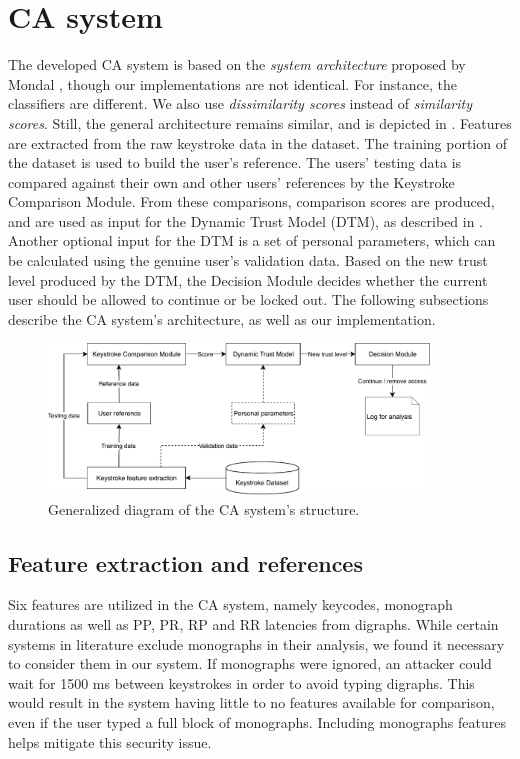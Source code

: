 \section{CA system}
\label{sec:system-design_CA-system}
The developed CA system is based on the \textit{system architecture} proposed by Mondal \cite{mondal}, though our implementations are not identical.
For instance, the classifiers are different. 
We also use \textit{dissimilarity scores} instead of \textit{similarity scores}.
Still, the general architecture remains similar, and is depicted in .
Features are extracted from the raw keystroke data in the dataset.
The training portion of the dataset is used to build the user's reference. 
The users' testing data is compared against their own and other users' references by the Keystroke Comparison Module.
From these comparisons, comparison scores are produced, and are used as input for the Dynamic Trust Model (DTM), as described in .
Another optional input for the DTM is a set of personal parameters, which can be calculated using the genuine user's validation data.
Based on the new trust level produced by the DTM, the Decision Module decides whether the current user should be allowed to continue or be locked out.
The following subsections describe the CA system's architecture, as well as our implementation.

\begin{figure}[h]
    \centering
    \includegraphics[width=0.9\textwidth]{figures/CA-diagram.pdf}
    \caption{Generalized diagram of the CA system's structure.}
    \label{fig:CA-diagram}
\end{figure}


\subsection{Feature extraction and references}
\label{sec:system-design-CA-ref}
Six features are utilized in the CA system, namely keycodes, monograph durations as well as PP, PR, RP and RR latencies from digraphs.
While certain systems in literature exclude monographs in their analysis, we found it necessary to consider them in our system.
If monographs were ignored, an attacker could wait for 1500 ms between keystrokes in order to avoid typing digraphs.
This would result in the system having little to no features available for comparison, even if the user typed a full block of monographs.
Including monographs features helps mitigate this security issue.

